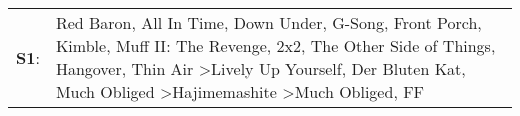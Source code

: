 \begin{supertabular}{p{0.03\textwidth}p{0.92\textwidth}}
 \textbf{S1}:  &  Red Baron\textsuperscript{}, \enspace All In Time\textsuperscript{}, \enspace Down Under\textsuperscript{}, \enspace G-Song\textsuperscript{}, \enspace Front Porch\textsuperscript{}, \enspace Kimble\textsuperscript{}, \enspace Muff II: The Revenge\textsuperscript{}, \enspace 2x2\textsuperscript{}, \enspace The Other Side of Things\textsuperscript{}, \enspace Hangover\textsuperscript{}, \enspace Thin Air\textsuperscript{} \textgreater \enspace Lively Up Yourself\textsuperscript{}, \enspace Der Bluten Kat\textsuperscript{}, \enspace Much Obliged\textsuperscript{} \textgreater \enspace Hajimemashite\textsuperscript{} \textgreater \enspace Much Obliged\textsuperscript{}, \enspace FF\textsuperscript{}  \enspace  \\
\end{supertabular}
